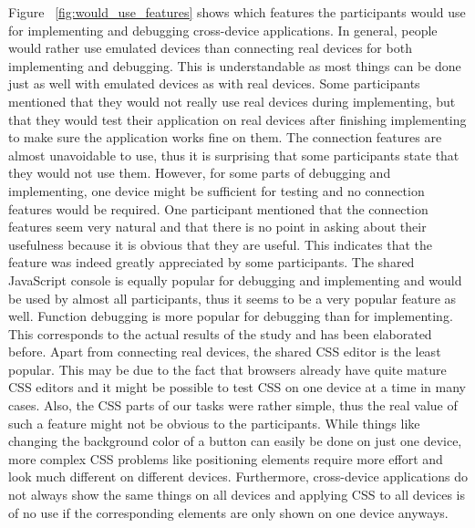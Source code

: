 Figure ~\ref{fig:would_use_features} shows which features the participants would use for implementing and debugging cross-device applications. In general, people would rather use emulated devices than connecting real devices for both implementing and debugging. This is understandable as most things can be done just as well with emulated devices as with real devices. Some participants mentioned that they would not really use real devices during implementing, but that they would test their application on real devices after finishing implementing to make sure the application works fine on them. The connection features are almost unavoidable to use, thus it is surprising that some participants state that they would not use them. However, for some parts of debugging and implementing, one device might be sufficient for testing and no connection features would be required. One participant mentioned that the connection features seem very natural and that there is no point in asking about their usefulness because it is obvious that they are useful. This indicates that the feature was indeed greatly appreciated by some participants. The shared JavaScript console is equally popular for debugging and implementing and would be used by almost all participants, thus it seems to be a very popular feature as well. Function debugging is more popular for debugging than for implementing. This corresponds to the actual results of the study and has been elaborated before. Apart from connecting real devices, the shared CSS editor is the least popular. This may be due to the fact that browsers already have quite mature CSS editors and it might be possible to test CSS on one device at a time in many cases. Also, the CSS parts of our tasks were rather simple, thus the real value of such a feature might not be obvious to the participants. While things like changing the background color of a button can easily be done on just one device, more complex CSS problems like positioning elements require more effort and look much different on different devices. Furthermore, cross-device applications do not always show the same things on all devices and applying CSS to all devices is of no use if the corresponding elements are only shown on one device anyways.


